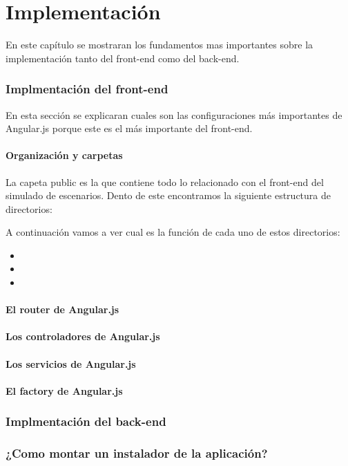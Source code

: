 \chapter{Implementación}

En este capítulo se mostraran los fundamentos mas importantes sobre la implementación tanto del front-end como del back-end.

\subsection{Implmentación del front-end}

En esta sección se explicaran cuales son las configuraciones más importantes de Angular.js porque este es el más importante del front-end. 

\subsubsection{Organización y carpetas}

La capeta public es la que contiene todo lo relacionado con el front-end del simulado de escenarios. Dento de este encontramos la siguiente estructura de directorios: 


A continuación vamos a ver cual es la función de cada uno de estos directorios:
\begin{itemize}
	\item 
	\item 
	\item 
\end{itemize}

\subsubsection{El router de Angular.js}



\subsubsection{Los controladores de Angular.js}


\subsubsection{Los servicios de Angular.js}


\subsubsection{El factory de Angular.js}


\subsection{Implmentación del back-end}



\subsection{¿Como montar un instalador de la aplicación?}


